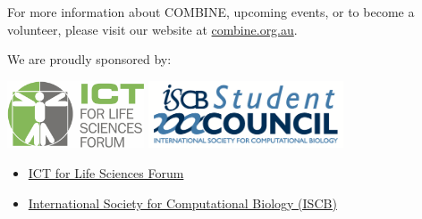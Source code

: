 \documentclass[12pt,]{article}
\begin{document}
For more information about COMBINE, upcoming events, or to become a
volunteer, please visit our website at
\href{http://www.combine.org.au}{combine.org.au}.

We are proudly sponsored by:

 \vspace{2ex}
\begin{minipage}[c]{0.5\columnwidth}
    \centering
    \includegraphics[height=20mm]{./images/ICT-for-Life-Sciences-Forum-logo.png}\quad
    \includegraphics[height=20mm]{./images/ISCBSC-logo.png}
\end{minipage}
\begin{minipage}[c]{0.5\columnwidth}
\begin{itemize}
    \itemsep1pt\parskip0pt
    \item
      \href{http://www.ict4lifesciences.org.au}{ICT for Life Sciences Forum}
    \item
      \href{http://www.iscb.org}{International Society for Computational
      Biology (ISCB)}
    \end{itemize}
\end{minipage}


\vfill
\end{document}
